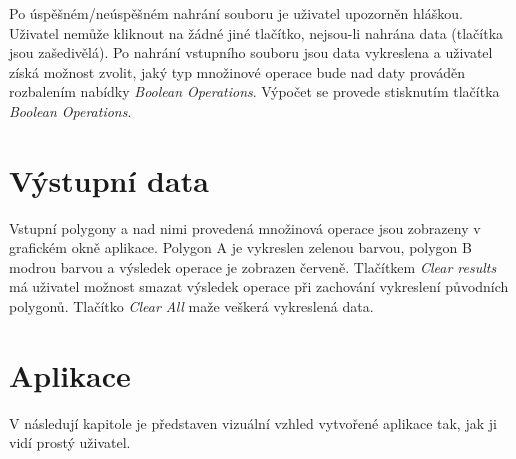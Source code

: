\documentclass[a4paper, 12pt]{article}
\begin{document}
Po úspěšném/neúspěšném nahrání souboru je uživatel upozorněn hláškou. Uživatel nemůže kliknout na žádné jiné tlačítko, nejsou-li nahrána data (tlačítka jsou zašedivělá). Po nahrání vstupního souboru jsou data vykreslena a uživatel získá možnost zvolit, jaký typ množinové operace bude nad daty prováděn rozbalením nabídky \textsl{Boolean Operations}. Výpočet se provede stisknutím tlačítka \textsl{Boolean Operations}. 

\section{Výstupní data}
Vstupní polygony a nad nimi provedená množinová operace jsou zobrazeny v grafickém okně aplikace. Polygon A je vykreslen zelenou barvou, polygon B modrou barvou a výsledek operace je zobrazen červeně. Tlačítkem \textsl{Clear results} má uživatel možnost smazat výsledek operace při zachování vykreslení původních polygonů. Tlačítko \textsl{Clear All} maže veškerá vykreslená data.\\
\clearpage


\section{Aplikace}
V následují kapitole je představen vizuální vzhled vytvořené aplikace tak, jak ji vidí prostý uživatel.
\end{document}
